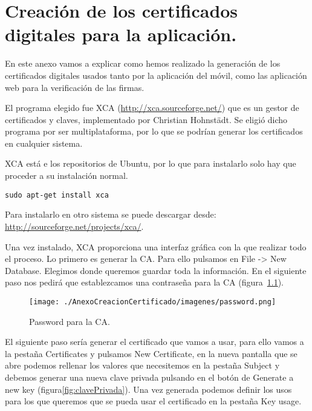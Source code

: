 \chapter[Creación certificados digitales.]{Creación de los certificados digitales para la aplicación.}\label{cap:anexoB}

En este anexo vamos a explicar como hemos realizado la generación de los certificados digitales usados tanto por la aplicación del móvil, como las aplicación web para la verificación de las firmas.

El programa elegido fue XCA (\url{http://xca.sourceforge.net/}) que es un gestor de certificados y claves, implementado por Christian Hohnstädt. Se eligió dicho programa por ser multiplataforma, por lo que se podrían generar los certificados en cualquier sistema.

XCA está e los repositorios de Ubuntu, por lo que para instalarlo solo hay que proceder a su instalación normal. 

\begin{lstlisting}[style=consola]
sudo apt-get install xca
\end{lstlisting}

Para instalarlo en otro sistema se puede descargar desde: \url{http://sourceforge.net/projects/xca/}.

Una vez instalado, XCA proporciona una interfaz gráfica con la que realizar todo el proceso. Lo primero es generar la CA. Para ello pulsamos en File -> New Database. Elegimos donde queremos guardar toda la información. En el siguiente paso nos pedirá que establezcamos una contraseña para la CA (figura~\ref{fig:password}).

\begin{figure}
  \centering
    \texttt{[image: ./AnexoCreacionCertificado/imagenes/password.png]}
  \caption{Password para la CA.}
  \label{fig:password}
\end{figure}

El siguiente paso sería generar el certificado que vamos a usar, para ello vamos a la pestaña Certificates y pulsamos New Certificate, en la nueva pantalla que se abre podemos rellenar los valores que necesitemos en la pestaña Subject y debemos generar una nueva clave privada pulsando en el botón de Generate a new key (figura\ref{fig:clavePrivada}). Una vez generada podemos definir los usos para los que queremos que se pueda usar el certificado en la pestaña Key usage.

